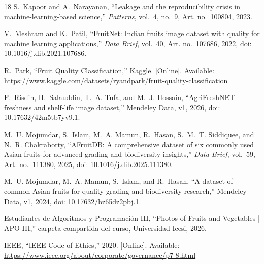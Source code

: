\documentclass[conference]{IEEEtran}
\begin{document}
\begin{thebibliography}{18}
S.~Kapoor and A.~Narayanan, ``Leakage and the reproducibility crisis in machine-learning-based science,'' \emph{Patterns}, vol.~4, no.~9, Art. no.~100804, 2023.

V.~Meshram and K.~Patil, ``FruitNet: Indian fruits image dataset with quality for machine learning applications,'' \emph{Data Brief}, vol.~40, Art. no.~107686, 2022, doi: 10.1016/j.dib.2021.107686.

R.~Park, ``Fruit Quality Classification,'' Kaggle. [Online]. Available: \url{https://www.kaggle.com/datasets/ryandpark/fruit-quality-classification}

F.~Risdin, H.~Salauddin, T.~A. Tufa, and M.~J. Hossain, ``AgriFreshNET freshness and shelf-life image dataset,'' Mendeley Data, v1, 2026, doi: 10.17632/42m5tb7yv9.1.

M.~U. Mojumdar, S.~Islam, M.~A. Mamun, R.~Hasan, S.~M.~T. Siddiquee, and N.~R. Chakraborty, ``AFruitDB: A comprehensive dataset of six commonly used Asian fruits for advanced grading and biodiversity insights,'' \emph{Data Brief}, vol.~59, Art. no.~111380, 2025, doi: 10.1016/j.dib.2025.111380.

M.~U. Mojumdar, M.~A. Mamun, S.~Islam, and R.~Hasan, ``A dataset of common Asian fruits for quality grading and biodiversity research,'' Mendeley Data, v1, 2024, doi: 10.17632/bz65dz2pbj.1.

Estudiantes de Algoritmos y Programación III, ``Photos of Fruits and Vegetables | APO III,'' carpeta compartida del curso, Universidad Icesi, 2026.

IEEE, ``IEEE Code of Ethics,'' 2020. [Online]. Available: \url{https://www.ieee.org/about/corporate/governance/p7-8.html}

\end{thebibliography}
\end{document}
